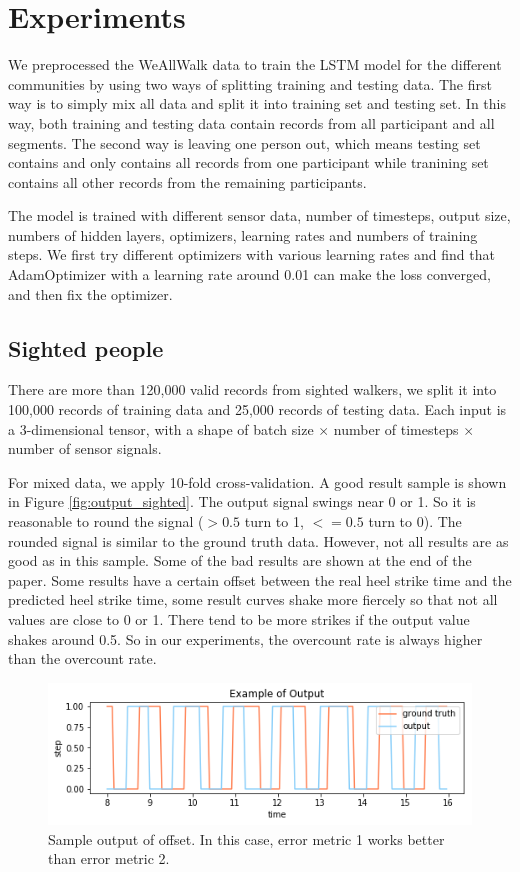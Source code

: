 \documentclass[11pt]{article}
\begin{document}
{\section{Experiments}

We preprocessed the WeAllWalk data to train the LSTM model for the different communities by using two ways of splitting training and testing data. The first way is to simply mix all data and split it into training set and testing set. In this way, both training and testing data contain records from all participant and all segments. The second way is leaving one person out, which means testing set contains and only contains all records from one participant while tranining set contains all other records from the remaining participants.

The model is trained with different sensor data, number of timesteps, output size, numbers of hidden layers, optimizers, learning rates and numbers of training steps. We first try different optimizers with various learning rates and find that AdamOptimizer with a learning rate around 0.01 can make the loss converged, and then fix the optimizer. 


\subsection{Sighted people}
There are more than 120,000 valid records from sighted walkers, we split it into 100,000 records of training data and 25,000 records of testing data. Each input is a 3-dimensional tensor, with a shape of batch size $\times$ number of timesteps $\times$ number of sensor signals.

For mixed data, we apply 10-fold cross-validation. A good result sample is shown in Figure \ref{fig:output_sighted}. The output signal swings near 0 or 1. So it is reasonable to round the signal ($>0.5$ turn to 1, $<=0.5$ turn to 0). The rounded signal is similar to the ground truth data. However, not all results are as good as in this sample. Some of the bad results are shown at the end of the paper. Some results have a certain offset between the real heel strike time and the predicted heel strike time, some result curves shake more fiercely so that not all values are close to 0 or 1. There tend to be more strikes if the output value shakes around 0.5. So in our experiments, the overcount rate is always higher than the overcount rate.

\begin{figure}[ht]
\centering
\includegraphics[scale=0.4]{output_ex_offset}
\caption{Sample output of offset. In this case, error metric 1 works better than error metric 2.}
\label{fig:output_ex_offset}
\end{figure}


}
\end{document}
